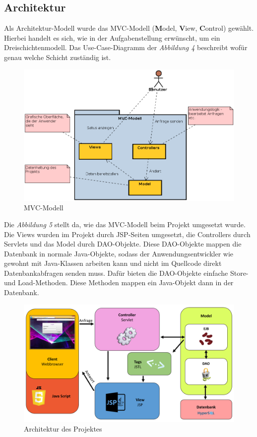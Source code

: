 \documentclass[12pt, a4paper]{article}
\begin{document}
\subsection{Architektur}
Als Architektur-Modell wurde das MVC-Modell (\textbf{M}odel, \textbf{V}iew, \textbf{C}ontrol) gewählt. Hierbei handelt es sich, wie in der Aufgabenstellung erwünscht, um ein Dreischichtenmodell. Das Use-Case-Diagramm der \textit{Abbildung 4} beschreibt wofür genau welche Schicht zuständig ist.

\begin{figure}[H]
	\begin{center}
		\includegraphics[width=130mm]{Bilder/MVC-Modell.png}
	\end{center}
	\caption{MVC-Modell}
\end{figure}

Die \textit{Abbildung 5} stellt da, wie das MVC-Modell beim Projekt umgesetzt wurde. Die \glqq Views\grqq{} wurden im Projekt durch JSP-Seiten umgesetzt, die \glqq Controllers\grqq{} durch Servlets und das \glqq Model\grqq{} durch DAO-Objekte. Diese DAO-Objekte mappen die Datenbank in normale Java-Objekte, sodass der Anwendungsentwickler wie gewohnt mit Java-Klassen arbeiten kann und nicht im Quellcode direkt Datenbankabfragen senden muss. Dafür bieten die DAO-Objekte einfache \glqq Store\grqq{}- und \glqq Load\grqq{}-Methoden. Diese Methoden mappen ein Java-Objekt dann in der Datenbank. 
\begin{figure}[H]
	\begin{center}
		\includegraphics[width=130mm]{Bilder/archDiagramm.png}
	\end{center}
	\caption{Architektur des Projektes}
\end{figure}
\end{document}
